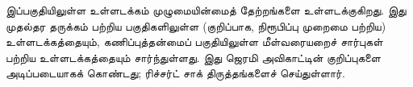 \documentclass[../../include/open-logic-part]{subfiles}
\begin{document}


\begin{editorial}
 இப்பகுதியிலுள்ள உள்ளடக்கம் முழுமையின்மைத் தேற்றங்களை உள்ளடக்குகிறது.
 இது முதல்தர தருக்கம் பற்றிய பகுதிகளிலுள்ள (குறிப்பாக, நிரூபிப்பு
 முறைமை பற்றிய) உள்ளடக்கத்தையும், கணிப்புத்தன்மைப் பகுதியிலுள்ள
 மீள்வரையறைச் சார்புகள் பற்றிய உள்ளடக்கத்தையும் சார்ந்துள்ளது.
 இது ஜெரமி அவிகாட்டின் குறிப்புகளை அடிப்படையாகக் கொண்டது;
 ரிச்சர்ட் சாக் திருத்தங்களைச் செய்துள்ளார்.
\end{editorial}






\OLEndPartHook
\end{document}
